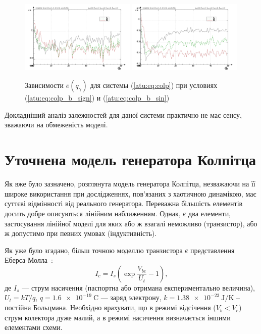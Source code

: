 \begin{figure}[htb!]
\centerline{
  \includegraphics[width=0.49\textwidth]{p/mod/colp_m5p-p_qg_e_sign.png}
  \includegraphics[width=0.49\textwidth]{p/mod/colp_m5p-p_qg_e_sin.png}
}
  \caption{Зависимости  $\overline{e}(q_\gamma)$ для системы (\ref{atu:eq:colp})
  при условиях (\ref{atu:eq:colp_b_sign}) и (\ref{atu:eq:colp_b_sin})
}
\label{atu:f:colp_e_qgamma}
\end{figure}

Докладніший аналіз залежностей для даної системи практично
не має сенсу, зважаючи на обмеженість моделі.




\section{Уточнена модель генератора Колпітца} %

Як вже було зазначено, розглянута модель генератора Колпітца,
незважаючи на її широке використання при дослідженнях,
пов'язаних з хаотичною динамікою, має суттєві відмінності від
реального генератора. Переважна більшість елементів досить
добре описуються лінійним наближенням. Однак, є два елементи,
застосування лінійної моделі для яких або ж взагалі неможливо
(транзистор), або ж допустимо при певних умовах (індуктивність).

Як уже було згадано, більш точною моделлю транзистора є представлення
Еберса-Молла~\cite{horowitz}:
%
\begin{equation}
  I_c = I_s \left( \exp\frac{V_{be}}{U_t} - 1 \right),
  \label{atu:eq:ebers-moll}
\end{equation}
%
де
$ I_s $ --- струм насичення (паспортна або отримана експериментально величина),
$U_t=kT/q$,
$q = \SI{1.6e-19}{\coulomb}$ --- заряд электрону,
$k = \SI{1.38e-23}{\joule/\kelvin}$ --
постійна Больцмана.
Необхідно врахувати, що в режимі відсічення ($ V_b <V_e $)
струм колектора дуже малий, а в режимі насичення
визначається іншими елементами схеми.

